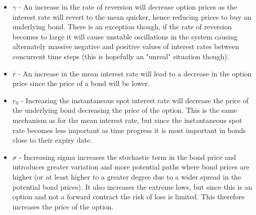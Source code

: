 \documentclass[10pt,a4paper]{article}
\theoremstyle{definition}
\theoremstyle{plain}
\theoremstyle{definition}
\theoremstyle{plain}
\begin{document}
\begin{itemize}
\item $\gamma$ - An increase in the rate of reversion will decrease option prices as the interest rate will revert to the mean quicker, hence reducing prices to buy an underlying bond. There is an exception though, if the rate of reversion becomes to large it will cause unstable oscillations in the system causing alternately massive negative and positive values of interest rates between concurrent time steps (this is hopefully an "unreal" situation though).
\item $\overline{r}$ - An increase in the mean interest rate will lead to a decrease in the option price since the price of a bond will be lower.
\item $r_{0}$ - Increasing the instantaneous spot interest rate will decrease the price of the underlying bond decreasing the price of the option. This is the same mechanism as for the mean interest rate, but since the instantaneous spot rate becomes less important as time progress it is most important in bonds close to their expiry date.
\item $\sigma$ - Increasing sigma increases the stochastic term in the bond price and introduces greater variation and more potential paths where bond prices are higher (or at least higher to a greater degree due to a wider spread in the potential bond prices). It also increases the extreme lows, but since this is an option and not a forward contract the risk of loss is limited. This therefore increases the price of the option.
\end{itemize}
\end{document}
